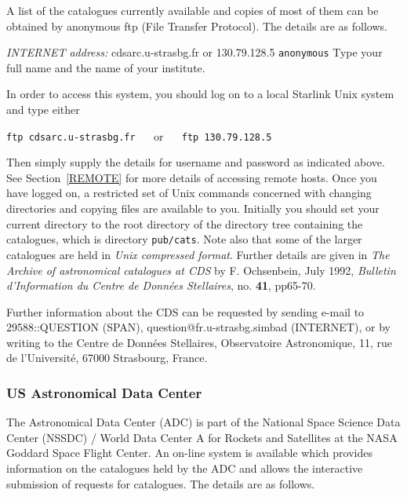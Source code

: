 \documentclass[twoside,11pt]{article}
\newcommand{\xlabel}[1]{}
\begin{document}
A list of the catalogues currently available and copies of most of them
can be obtained by anonymous ftp (File Transfer Protocol). The details
are as follows.

{\it INTERNET address: } cdsarc.u-strasbg.fr or 130.79.128.5
 \verb-anonymous-
 Type your full name and the name of your
institute.

In order to access this system, you should log on to a local Starlink
Unix system and type either

\vspace{2.0 mm}
\verb:ftp cdsarc.u-strasbg.fr: ~~ or ~~ \verb:ftp 130.79.128.5:
\vspace{2.0 mm}

Then simply supply the details for username and password as indicated
above.  See Section~\ref{REMOTE} for more details of accessing remote
hosts. Once you have logged on, a restricted set of Unix commands
concerned with changing directories and copying files are available to
you. Initially you should set your current directory to the root
directory of the directory tree containing the catalogues, which is
directory \verb-pub/cats-. Note also that some of the larger catalogues
are held in {\it Unix compressed format}. Further details are given in
{\it The Archive of astronomical catalogues at CDS} by F. Ochsenbein,
July 1992, {\it Bulletin d'Information du Centre de Donn\'{e}es
Stellaires}, no. {\bf 41}, pp65-70.

Further information about the CDS can be requested by sending e-mail
to 29588::QUESTION (SPAN), question@fr.u-strasbg.simbad (INTERNET), or
by writing to the Centre de Donn\'{e}es Stellaires, Observatoire
Astronomique, 11, rue de l'Universit\'{e}, 67000 Strasbourg, France.

\subsubsection{US Astronomical Data Center
\xlabel{us_astronomical_data_center}\label{ADC}}

The Astronomical Data Center (ADC) is part of the National Space
Science Data Center (NSSDC) / World Data Center A for Rockets and
Satellites at the NASA Goddard Space Flight Center. An on-line system
is available which provides information on the catalogues held by the
ADC and allows the interactive submission of requests for catalogues.
The details are as follows.
\end{document}
